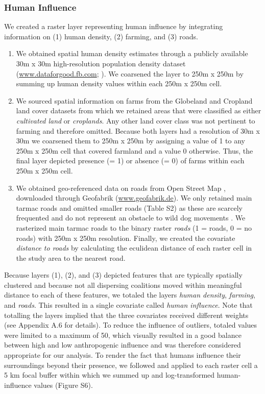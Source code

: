 \documentclass[abstract=on,10pt,a4paper,bibliography=totocnumbered]{article}
\begin{document}
\subsubsection{Human Influence}
We created a raster layer representing human influence by integrating
information on (1) human density, (2) farming, and (3) roads.

\begin{enumerate}[label = (\arabic*)]

  \item We obtained spatial human density estimates through a publicly available
  30m x 30m high-resolution population density dataset
  (\url{www.dataforgood.fb.com}; \citealp{Facebook.2019}). We coarsened the
  layer to 250m x 250m by summing up human density values within each 250m x
  250m cell.

  \item We sourced spatial information on farms from the Globeland
  \citep{Chen.2015} and Cropland \citep{Xiong.2017} land cover datasets from
  which we retained areas that were classified as either \textit{cultivated
  land} or \textit{croplands}. Any other land cover class was not pertinent to
  farming and therefore omitted. Because both layers had a resolution of 30m x
  30m we coarsened them to 250m x 250m by assigning a value of 1 to any 250m x
  250m cell that covered farmland and a value 0 otherwise. Thus, the final layer
  depicted presence (= 1) or absence (= 0) of farms within each 250m x 250m
  cell.

  \item We obtained geo-referenced data on roads from Open Street Map
  \citep{OpenStreetMap.2019}, downloaded through Geofabrik
  (\url{www.geofabrik.de}). We only retained main tarmac roads and omitted
  smaller roads (Table S2) as these are scarcely frequented and do not represent
  an obstacle to wild dog movements \citep{Abrahms.2016}. We rasterized main
  tarmac roads to the binary raster \textit{roads} (1 = roads, 0 = no roads)
  with 250m x 250m resolution. Finally, we created the covariate
  \textit{distance to roads} by calculating the eculidean distance of each
  raster cell in the study area to the nearest road.

\end{enumerate}

\noindent Because layers (1), (2), and (3) depicted features that are typically
spatially clustered and because not all dispersing coalitions moved within
meaningful distance to each of these features, we totaled the layers
\textit{human density}, \textit{farming}, and \textit{roads}. This resulted in a
single covariate called \textit{human influence}. Note that totalling the layers
implied that the three covariates received different weights (see Appendix A.6
for details). To reduce the influence of outliers, totaled values were limited
to a maximum of 50, which visually resulted in a good balance between high and
low anthropogenic influence and was therefore considered appropriate for our
analysis. To render the fact that humans influence their surroundings beyond
their presence, we followed \cite{Elliot.2014} and applied to each raster cell a
5 km focal buffer within which we summed up and log-transformed human-influence
values (Figure S6).
\end{document}
